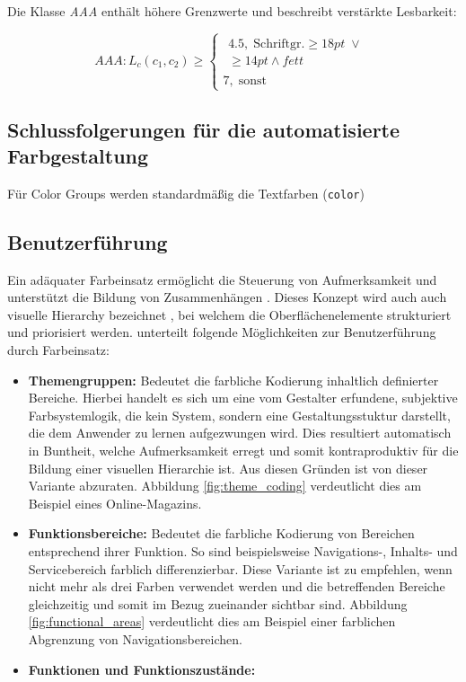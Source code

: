 \documentclass[11pt,a4paper,bibliography=totoc,twocolumn]{scrartcl}
\begin{document}
Die Klasse \emph{AAA} enthält höhere Grenzwerte und beschreibt verstärkte Lesbarkeit:

\begin{equation}
  	AAA: L_c(c_1, c_2) \geq
	\begin{cases}
		\begin{split}4.5, \; \text{Schriftgr.} \geq 18pt \; \lor \\ \geq 14pt \land fett\end{split} \\
		7,  \;  \text{sonst}
	\end{cases}
\end{equation}

\subsection*{Schlussfolgerungen für die automatisierte Farbgestaltung}
Für Color Groups werden standardmäßig die Textfarben (\texttt{color}) 

\subsection{Benutzerführung}
Ein adäquater Farbeinsatz ermöglicht die Steuerung von Aufmerksamkeit und unterstützt die Bildung von Zusammenhängen \citep{webdesign}.  Dieses Konzept wird auch auch visuelle Hierarchy bezeichnet \citep{visual-hierarchy}, bei welchem die Oberflächenelemente strukturiert und priorisiert werden.
\citet{webdesign} unterteilt folgende Möglichkeiten zur Benutzerführung durch Farbeinsatz:

\begin{itemize}
	\item \textbf{Themengruppen:} Bedeutet die farbliche Kodierung inhaltlich definierter Bereiche. Hierbei handelt es sich um eine vom Gestalter erfundene, subjektive Farbsystemlogik, die kein System, sondern eine Gestaltungsstuktur darstellt, die dem Anwender zu lernen aufgezwungen wird. Dies resultiert automatisch in Buntheit, welche Aufmerksamkeit erregt und somit kontraproduktiv für die Bildung einer visuellen Hierarchie ist. Aus diesen Gründen ist von dieser Variante abzuraten. Abbildung \ref{fig:theme_coding} verdeutlicht dies am Beispiel eines Online-Magazins.
	\item \textbf{Funktionsbereiche:} Bedeutet die farbliche Kodierung von Bereichen entsprechend ihrer Funktion. So sind beispielsweise Navigations-, Inhalts- und Servicebereich farblich differenzierbar. Diese Variante ist zu empfehlen, wenn nicht mehr als drei Farben verwendet werden und die betreffenden Bereiche gleichzeitig und somit im Bezug zueinander sichtbar sind. Abbildung \ref{fig:functional_areas} verdeutlicht dies am Beispiel einer farblichen Abgrenzung von Navigationsbereichen.
	\item \textbf{Funktionen und Funktionszustände:} 
\end{itemize}
\end{document}
